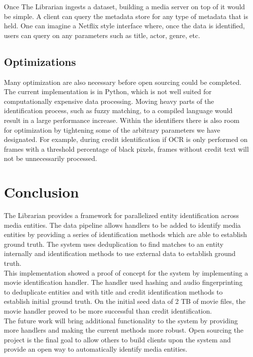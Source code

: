 \documentclass[paper=a4, fontsize=11pt]{scrartcl} %
\numberwithin{equation}{section} %
\numberwithin{figure}{section} %
\numberwithin{table}{section} %
\begin{document}
Once The Librarian ingests a dataset, building a media server on top of it would be simple. A client can query the metadata store for any type of metadata that is held. One can imagine a Netflix style interface where, once the data is identified, users can query on any parameters such as title, actor, genre, etc. \\

\subsection{Optimizations}
\label{sec:optimizations}
Many optimization are also necessary before open sourcing could be completed. The current implementation is in Python, which is not well suited for computationally expensive data processing. Moving heavy parts of the identification process, such as fuzzy matching, to a compiled language would result in a large performance increase. Within the identifiers there is also room for optimization by tightening some of the arbitrary parameters we have designated. For example, during credit identification if OCR is only performed on frames with a threshold percentage of black pixels, frames without credit text will not be unnecessarily processed. \\


\section{Conclusion}
\label{sec:conclusion}

The Librarian provides a framework for parallelized entity identification across media entities. The data pipeline allows handlers to be added to identify media entities by providing a series of identification methods which are able to establish ground truth. The system uses deduplication to find matches to an entity internally and identification methods to use external data to establish ground truth. \\

This implementation showed a proof of concept for the system by implementing a movie identification handler. The handler used hashing and audio fingerprinting to deduplicate entities and with title and credit identification methods to establish initial ground truth. On the initial seed data of 2 TB of movie files, the movie handler proved to be more successful than credit identification. \\

The future work will bring additional functionality to the system by providing more handlers and making the current methods more robust. Open sourcing the project is the final goal to allow others to build clients upon the system and provide an open way to automatically identify media entities. \\

\end{document}
